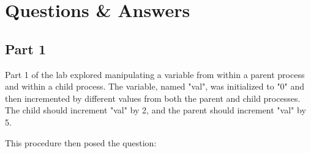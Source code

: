 
\section{Questions \& Answers}\label{sec:qa}

    \subsection{Part 1}\label{subsec:part1_qa}
        Part 1 of the lab explored manipulating a variable from within a parent process and within a child process.
        The variable, named "val", was initialized to "0" and then incremented by different values from both the parent and child processes.
        The child should increment "val" by 2, and the parent should increment "val" by 5.

        \medskip
        \noindent This procedure then posed the question:


